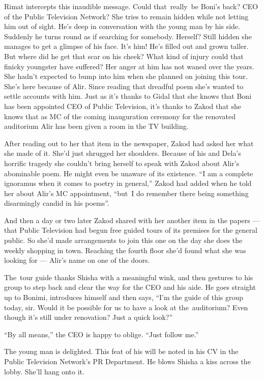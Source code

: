 \documentclass[twoside,11pt]{book}
\begin{document}
Rimat intercepts this inaudible message. Could that~really~be Boni's back? CEO of the Public Television Network? She
tries to remain hidden while not letting him out of sight. He's deep in conversation with the young man by his side.
Suddenly he turns round as if searching for somebody. Herself? Still hidden she manages to get a glimpse of his face.
It's him! He's filled out and grown taller. But where did he get that scar on his cheek? What kind of injury could
that finicky youngster have suffered? Her anger at him has not waned over the years. She hadn't expected to bump into
him when she planned on joining this tour{.} She's here because of
Alir.  Since reading that dreadful poem she's wanted to settle accounts with him. Just as it's thanks to Gidal that
she knows that Boni has been appointed CEO of Public Television, it's thanks to Zakod that she knows that as MC of
the coming{ }inauguration ceremony for the renovated auditorium Alir
has been given a room in the TV building.

After reading out to her that item in the newspaper, Zakod had asked her what she made of it. She'd just shrugged her
shoulders. Because of his and Dela's horrific tragedy she couldn't bring herself to speak with Zakod about Alir's
abominable poem. He might even be unaware of its existence. ``I am a complete ignoramus when it comes to
poetry in general,'' Zakod had added when he told her about Alir's MC appointment, ``but~I
do remember there being something disarmingly candid in his poems''.

And then a day or two later Zakod shared with her another item in the papers --- that Public Television had begun free
guided tours of its premises for the general public. So she'd made arrangements to join this one on the day she does
the weekly shopping in town. Reaching the fourth floor she'd found what she was looking for --- Alir's name on one of the
doors.

The~tour guide thanks Shisha with a meaningful wink, and then gestures to his group to step back and clear the way for
the CEO and his aide. He goes straight up to Bonimi, introduces himself and then says, ``I'm the guide of
this group today, sir. Would it be possible for us to have a look at the~auditorium? Even though it's still under
renovation? Just a quick look?''

``By all means,'' the CEO is happy to oblige. ``Just follow me.''

The young man is delighted. This feat of his will be noted in his CV in the Public Television Network's PR Department.
He blows Shisha a kiss across the lobby. She'll hang onto it.
\end{document}
